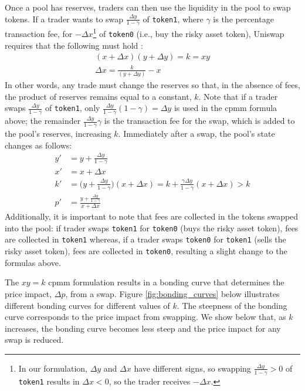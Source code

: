 \documentclass[11pt]{article}
\begin{document}
Once a pool has reserves, traders can then use the liquidity in the pool to swap tokens. If a trader wants to swap $\frac{\Delta y}{1 - \gamma}$ of \texttt{token1}, where $\gamma$ is the percentage transaction fee, for $-\Delta x$\footnote{In our formulation, $\Delta y$ and $\Delta x$ have different signs, so swapping $\frac{\Delta y}{1 - \gamma} > 0$ of \texttt{token1} results in $\Delta x < 0$, so the trader receives $-\Delta x$.} of \texttt{token0} (i.e., buy the risky asset token), Uniswap requires that the following must hold \citep{constantproductmarkets}:
\begin{gather}
    (x + \Delta x)(y + \Delta y) = k = xy \label{eq:1}\\
    \Delta x = \frac{k}{(y + \Delta y)} - x \label{eq:2}
\end{gather}
In other words, any trade must change the reserves so that, in the absence of fees, the product of reserves remains equal to a constant, $k$. Note that if a trader swaps $\frac{\Delta y}{1 - \gamma}$ of \texttt{token1}, only $\frac{\Delta y}{1 - \gamma} (1 - \gamma) = \Delta y$ is used in the \gls{cpmm} formula above; the remainder $\frac{\Delta y}{1 - \gamma} \gamma$ is the transaction fee for the swap, which is added to the pool's reserves, increasing $k$. Immediately after a swap, the pool's state changes as follows:
\begin{align*}
    y' &= y + \frac{\Delta y}{1 - \gamma} \\
    x' &= x + \Delta x \\
    k' &= \bigg( y + \frac{\Delta y}{1 - \gamma} \bigg)(x + \Delta x) = k + \frac{\gamma \Delta y}{1 - \gamma} (x + \Delta x) > k \\
    p' &= \frac{y + \frac{\Delta y}{1 - \gamma}}{x + \Delta x}
\end{align*}
Additionally, it is important to note that fees are collected in the tokens swapped into the pool: if trader swaps \texttt{token1} for \texttt{token0} (buys the risky asset token), fees are collected in \texttt{token1} whereas, if a trader swaps \texttt{token0} for \texttt{token1} (sells the risky asset token), fees are collected in \texttt{token0}, resulting a slight change to the formulas above.

The $xy = k$ \gls{cpmm} formulation results in a bonding curve that determines the price impact, $\Delta p$, from a swap. Figure \ref{fig:bonding_curves} below illustrates different bonding curves for different values of $k$. The steepness of the bonding curve corresponds to the price impact from swapping. We show below that, as $k$ increases, the bonding curve becomes less steep and the price impact for any swap is reduced.
\end{document}
